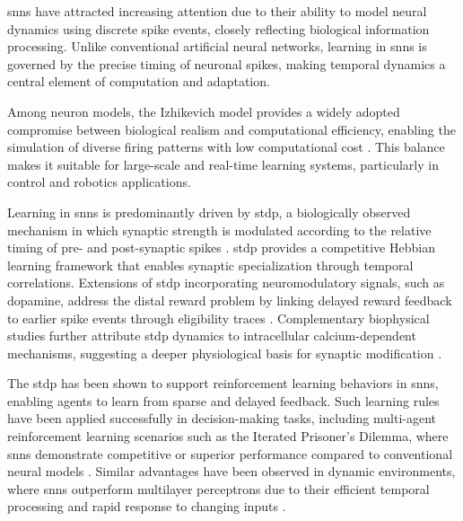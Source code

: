 


\ac{snn}s have attracted increasing attention due to their ability to model neural dynamics using discrete spike events, closely reflecting biological information processing. Unlike conventional artificial neural networks, learning in \ac{snn}s is governed by the precise timing of neuronal spikes, making temporal dynamics a central element of computation and adaptation.

Among neuron models, the Izhikevich model provides a widely adopted compromise between biological realism and computational efficiency, enabling the simulation of diverse firing patterns with low computational cost \cite{izhikevich2003simple}. This balance makes it suitable for large-scale and real-time learning systems, particularly in control and robotics applications.

Learning in \ac{snn}s is predominantly driven by \ac{stdp}, a biologically observed mechanism in which synaptic strength is modulated according to the relative timing of pre- and post-synaptic spikes \cite{Ch2_R9}. \ac{stdp} provides a competitive Hebbian learning framework that enables synaptic specialization through temporal correlations. Extensions of \ac{stdp} incorporating neuromodulatory signals, such as dopamine, address the distal reward problem by linking delayed reward feedback to earlier spike events through eligibility traces \cite{Ch_1_R22}. Complementary biophysical studies further attribute \ac{stdp} dynamics to intracellular calcium-dependent mechanisms, suggesting a deeper physiological basis for synaptic modification \cite{Ch2_R6}.

The \ac{stdp} has been shown to support reinforcement learning behaviors in \ac{snn}s, enabling agents to learn from sparse and delayed feedback. Such learning rules have been applied successfully in decision-making tasks, including multi-agent reinforcement learning scenarios such as the Iterated Prisoner’s Dilemma, where \ac{snn}s demonstrate competitive or superior performance compared to conventional neural models \cite{Ch2_R4}. Similar advantages have been observed in dynamic environments, where \ac{snn}s outperform multilayer perceptrons due to their efficient temporal processing and rapid response to changing inputs \cite{Ch2_R2}.

